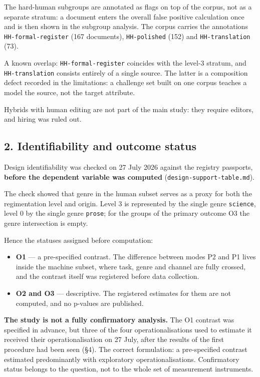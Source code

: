 \documentclass[11pt,a4paper]{article}
\renewcommand{\_}{\textunderscore\allowbreak}
\begin{document}
The hard-human subgroups are annotated as flags on top of the corpus, not as a
separate stratum: a document enters the overall false positive calculation once
and is then shown in the subgroup analysis. The corpus carries the annotations
\texttt{HH-\allowbreak{}formal-\allowbreak{}register} (167 documents), \texttt{HH-\allowbreak{}polished} (152) and \texttt{HH-\allowbreak{}translation} (73).

A known overlap: \texttt{HH-\allowbreak{}formal-\allowbreak{}register} coincides with the level-3 stratum, and
\texttt{HH-\allowbreak{}translation} consists entirely of a single source. The latter is a composition
defect recorded in the limitations: a challenge set built on one corpus teaches a
model the source, not the target attribute.

Hybrids with human editing are not part of the main study: they require editors,
and hiring was ruled out.

\subsection{2. Identifiability and outcome status}

Design identifiability was checked on 27 July 2026 against the registry passports,
\textbf{before the dependent variable was computed} (\texttt{design-\allowbreak{}support-\allowbreak{}table.md}).

The check showed that genre in the human subset serves as a proxy for both the
regimentation level and origin. Level 3 is represented by the single genre
\texttt{science}, level 0 by the single genre \texttt{prose}; for the groups of the primary
outcome O3 the genre intersection is empty.

Hence the statuses assigned before computation:

\begin{itemize}
\item \textbf{O1} — a pre-specified contrast. The difference between modes P2 and P1 lives inside the machine subset, where task, genre and channel are fully crossed, and the contrast itself was registered before data collection.
\item \textbf{O2 and O3} — descriptive. The registered estimates for them are not computed, and no p-values are published.
\end{itemize}

\textbf{The study is not a fully confirmatory analysis.} The O1 contrast was specified
in advance, but three of the four operationalisations used to estimate it received
their operationalisation on 27 July, after the results of the first procedure had
been seen (§4). The correct formulation: a pre-specified contrast estimated
predominantly with exploratory operationalisations. Confirmatory status belongs to
the question, not to the whole set of measurement instruments.
\end{document}
